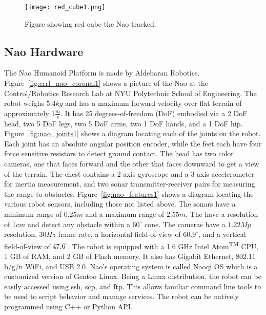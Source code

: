 \begin{figure}
\centering
\texttt{[image: red\_cube1.png]}
\caption{Figure showing red cube the Nao tracked.}
\label{fig:red_cube1}
\end{figure}

\subsection{Nao Hardware}
The Nao Humanoid Platform is made by Aldebaran Robotics. 
Figure~\ref{fig:crrl_nao_coronal1} shows a picture of the Nao at the
Control/Robotics Research Lab at NYU Polytechnic School of Engineering.
The robot weighs $5.4 kg$ and has a maximum forward velocity over flat
terrain of approximately $1 \frac{m}{s}$.
It has 25 degrees-of-freedom (DoF) embodied via a 2 DoF head, two 5 DoF legs,
two 5 DoF arms, two 1 DoF hands, and a 1 DoF hip.
Figure~\ref{fig:nao_joints1} shows a diagram locating each of the joints on
the robot.
Each joint has an absolute angular position encoder, while the feet each have
four force sensitive resistors to detect ground contact.
The head has two color cameras, one that faces forward and the other that faces
downward to get a view of the terrain. The chest contains a 2-axis gyroscope and
a 3-axis accelerometer for inertia measurement, and two sonar transmitter-receiver
pairs for measuring the range to obstacles.
Figure~\ref{fig:nao_features1} shows a diagram locating the various robot sensors,
including those not listed above.
The sonars have a minimum range of $0.25 m$ and a maximum range of $2.55 m$.
The have a resolution of $1 cm$ and detect any obstacle within a $60^\circ$
cone. The cameras have a $1.22 Mp$ resolution, $30 Hz$ frame rate,
a horizontal field-of-view of $60.9^\circ$, and a vertical field-of-view of
$47.6^\circ$.
The robot is equipped with a 1.6 GHz Intel\textsuperscript{\textregistered}
Atom\textsuperscript{TM} CPU, 1 GB of RAM, and 2 GB of Flash memory.
It also has Gigabit Ethernet, 802.11 b/g/n WiFi, and USB 2.0. 
Nao's operating system is called Naoqi OS which is a customized version of
Gentoo Linux. Being a Linux distribution, the robot can be easily accessed
using ssh, scp, and ftp. This allows familiar command line tools to be used
to script behavior and manage services.
The robot can be natively programmed using C++ or Python API.

